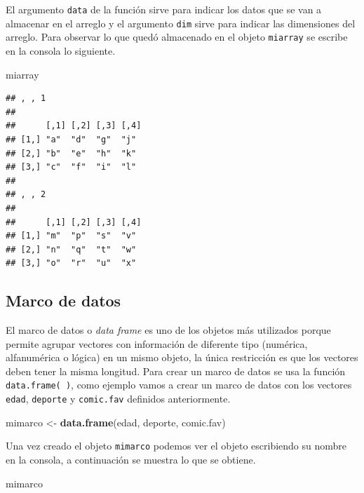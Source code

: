 \documentclass[10pt,]{krantz}
\makeatletter
\newenvironment{Shaded}{\begin{snugshade}}{\end{snugshade}}
\newcommand{\KeywordTok}[1]{\textcolor[rgb]{0.13,0.29,0.53}{\textbf{{#1}}}}
\newcommand{\StringTok}[1]{\textcolor[rgb]{0.31,0.60,0.02}{{#1}}}
\newcommand{\NormalTok}[1]{{#1}}
\newenvironment{kframe}{%
\medskip{}
\setlength{\fboxsep}{.8em}
 \def\at@end@of@kframe{}%
 \ifinner\ifhmode%
  \def\at@end@of@kframe{\end{minipage}}%
  \begin{minipage}{\columnwidth}%
 \fi\fi%
 \def\FrameCommand##1{\hskip\@totalleftmargin \hskip-\fboxsep
 \colorbox{shadecolor}{##1}\hskip-\fboxsep
     \hskip-\linewidth \hskip-\@totalleftmargin \hskip\columnwidth}%
 \MakeFramed {\advance\hsize-\width
   \@totalleftmargin\z@ \linewidth\hsize
   \@setminipage}}%
 {\par\unskip\endMakeFramed%
 \at@end@of@kframe}
\renewenvironment{Shaded}{\begin{kframe}}{\end{kframe}}
\makeatother
\begin{document}
El argumento \texttt{data} de la función sirve para indicar los datos
que se van a almacenar en el arreglo y el argumento \texttt{dim} sirve
para indicar las dimensiones del arreglo. Para observar lo que quedó
almacenado en el objeto \texttt{miarray} se escribe en la consola lo
siguiente.

\begin{Shaded}
\begin{Highlighting}[]
\NormalTok{miarray}
\end{Highlighting}
\end{Shaded}

\begin{verbatim}
## , , 1
## 
##      [,1] [,2] [,3] [,4]
## [1,] "a"  "d"  "g"  "j" 
## [2,] "b"  "e"  "h"  "k" 
## [3,] "c"  "f"  "i"  "l" 
## 
## , , 2
## 
##      [,1] [,2] [,3] [,4]
## [1,] "m"  "p"  "s"  "v" 
## [2,] "n"  "q"  "t"  "w" 
## [3,] "o"  "r"  "u"  "x"
\end{verbatim}

\subsection{Marco de datos}

El marco de datos  o \textit{data frame} es uno de
los objetos más utilizados porque permite agrupar vectores con
información de diferente tipo (numérica, alfanumérica o lógica) en un
mismo objeto, la única restricción es que los vectores deben tener la
misma longitud. Para crear un marco de datos se usa la función
\texttt{data.frame(\ )}, como ejemplo vamos a crear un marco de datos
con los vectores \texttt{edad}, \texttt{deporte} y \texttt{comic.fav}
definidos anteriormente.

\begin{Shaded}
\begin{Highlighting}[]
\NormalTok{mimarco <-}\StringTok{ }\KeywordTok{data.frame}\NormalTok{(edad, deporte, comic.fav)}
\end{Highlighting}
\end{Shaded}

Una vez creado el objeto \texttt{mimarco} podemos ver el objeto
escribiendo su nombre en la consola, a continuación se muestra lo que se
obtiene.

\begin{Shaded}
\begin{Highlighting}[]
\NormalTok{mimarco}
\end{Highlighting}
\end{Shaded}
\end{document}
